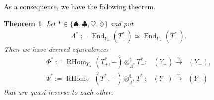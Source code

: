\documentclass[11pt]{article}
\DeclareMathOperator{\D}{D^b}
\DeclareMathOperator{\End}{End}
\DeclareMathOperator{\RHom}{RHom}
\numberwithin{equation}{section}
\newtheorem{Theorem}{Theorem}[section]
\begin{document}
As a consequence, we have the following theorem.
\begin{Theorem}
Let $\ast \in \{ \spadesuit, \clubsuit, \heartsuit, \diamondsuit \}$ and put
\begin{gather*}
\Lambda^{\ast} := \End_{Y_+}(T_+^{\ast}) \simeq \End_{Y_-}(T_-^{\ast}).
\end{gather*}
Then we have derived equivalences
\begin{align*}
\Phi^{\ast} := \RHom_{Y_+}(T^{\ast}_+, -) \otimes^{\mathbb{L}}_{\Lambda^{\ast}} T_-^{\ast}\colon\ \D(Y_+) \xrightarrow{\sim} \D(Y_-), \\
\Psi^{\ast} := \RHom_{Y_-}(T^{\ast}_-, -) \otimes^{\mathbb{L}}_{\Lambda^{\ast}} T_+^{\ast}\colon\ \D(Y_-) \xrightarrow{\sim} \D(Y_+)
\end{align*}
that are quasi-inverse to each other.
\end{Theorem}
\end{document}
